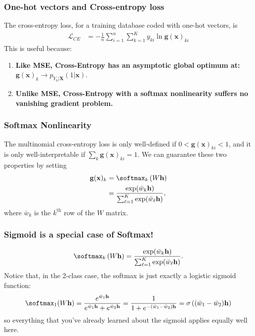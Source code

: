 \begin{frame}
  \frametitle{One-hot vectors and Cross-entropy loss}
  
  The cross-entropy loss, for a training database coded with one-hot vectors, is
  \begin{align*}
    {\mathcal L}_{CE} &=-\frac{1}{n}\sum_{i=1}^n\sum_{k=1}^K y_{ki}\ln\mathbf{g}(\mathbf{x})_{ki}
  \end{align*}
  This is useful because:
  \begin{enumerate}
  \item {\bf Like MSE, Cross-Entropy has an asymptotic global optimum at:}
    $\mathbf{g}(\mathbf{x})_k\rightarrow p_{Y_k|\mathbf{X}}(1|\mathbf{x})$.
  \item {\bf Unlike MSE, Cross-Entropy with a softmax nonlinearity
    suffers no vanishing gradient problem.}
  \end{enumerate}
\end{frame}

\begin{frame}
  \frametitle{Softmax Nonlinearity}

  The multinomial cross-entropy loss is only well-defined if
  $0<\mathbf{g}(\mathbf{x})_{ki}<1$, and it is only well-interpretable if
  $\sum_k\mathbf{g}(\mathbf{x})_{ki}=1$.  We can guarantee these two properties by
  setting
  \begin{align*}
    \mathbf{g}(\mathbf{x})_k &= \softmax_k\left(W\mathbf{h}\right)\\
    &= \frac{\exp(\bar{w}_k\mathbf{h})}{\sum_{\ell=1}^K
      \exp(\bar{w}_\ell\mathbf{h})},
  \end{align*}
  where $\bar{w}_k$ is the $k^{\textrm{th}}$ row of the $W$ matrix.
\end{frame}

\begin{frame}
  \frametitle{Sigmoid is a special case of Softmax!}

  \begin{displaymath}
    \softmax_k\left(W\mathbf{h}\right)
    = \frac{\exp(\bar{w}_k\mathbf{h})}{\sum_{\ell=1}^K
      \exp(\bar{w}_\ell\mathbf{h})}.
  \end{displaymath}
  Notice that, in the 2-class case, the softmax is just exactly a
  logistic sigmoid function:
  \begin{displaymath}
    \softmax_1(W\mathbf{h}) = \frac{e^{\bar{w}_1\mathbf{h}}}{e^{\bar{w}_1\mathbf{h}}+e^{\bar{w}_2\mathbf{h}}}
    = \frac{1}{1+e^{-(\bar{w}_1-\bar{w}_2)\mathbf{h}}}  =\sigma\left((\bar{w}_1-\bar{w}_2)\mathbf{h}\right)
  \end{displaymath}
  so everything that you've already learned about the sigmoid applies
  equally well here.
\end{frame}
